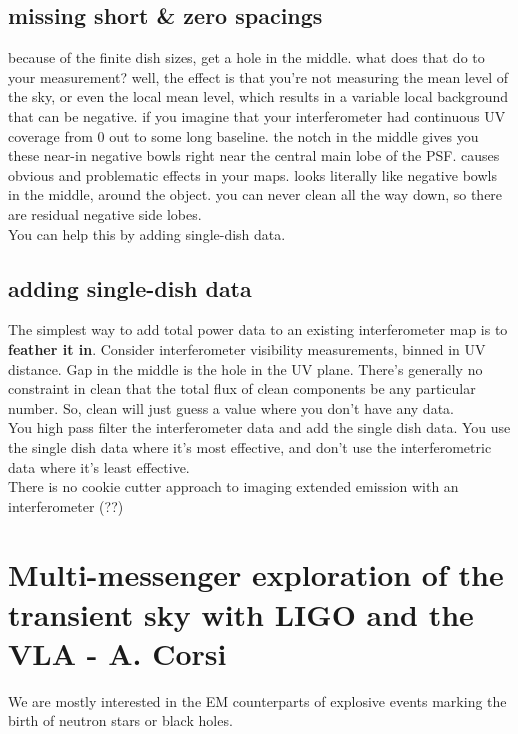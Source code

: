\documentclass[a4paper]{article}
\begin{document}
\subsection{missing short \& zero spacings}

because of the finite dish sizes, get a hole in the middle. what does that do to your measurement? well, the effect is that you're not measuring the mean level of the sky, or even the local mean level, which results in a variable local background that can be negative.
if you imagine that your interferometer had continuous UV coverage from 0 out to some long baseline. the notch in the middle gives you these near-in negative bowls right near the central main lobe of the PSF. causes obvious and problematic effects in your maps. looks literally like negative bowls in the middle, around the object. you can never clean all the way down, so there are residual negative side lobes.\\

You can help this by adding single-dish data.

\subsection{adding single-dish data}

The simplest way to add total power data to an existing interferometer map is to \textbf{feather it in}. Consider interferometer visibility measurements, binned in UV distance. Gap in the middle is the hole in the UV plane. There's generally no constraint in clean that the total flux of clean components be any particular number. So, clean will just guess a value where you don't have any data. \\

You high pass filter the interferometer data and add the single dish data. You use the single dish data where it's most effective, and don't use the interferometric data where it's least effective. \\ 

There is no cookie cutter approach to imaging extended emission with an interferometer (??) 

\section{Multi-messenger exploration of the transient sky with LIGO and the VLA - A. Corsi}

We are mostly interested in the EM counterparts of explosive events marking the birth of neutron stars or black holes. \\
\end{document}
